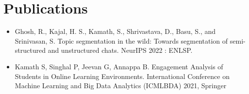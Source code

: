 \documentclass{article}
\begin{document}


\section{Publications}
\begin{itemize}
\item Ghosh, R., Kajal, H. S., Kamath, S., Shrivastava, D., Basu, S., and Srinivasan, S. Topic segmentation in the wild: Towards segmentation of semi-structured and unstructured chats. NeurIPS 2022 : ENLSP. 
\item Kamath S, Singhal P, Jeevan G, Annappa B. Engagement Analysis of Students in Online Learning Environments. International Conference on Machine Learning and Big Data Analytics (ICMLBDA) 2021, Springer 

\end{itemize}

\end{document}
